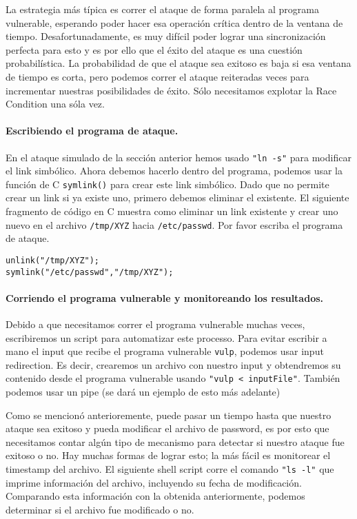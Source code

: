 La estrategia más típica es correr el ataque de forma paralela al programa vulnerable, esperando poder hacer esa operación crítica dentro de la ventana de tiempo. Desafortunadamente, es muy difícil poder lograr una sincronización perfecta para esto y es por ello que el éxito del ataque es una cuestión probabilística. La probabilidad de que el ataque sea exitoso es baja si esa ventana de tiempo es corta, pero podemos correr el ataque reiteradas veces para incrementar nuestras posibilidades de éxito.
Sólo necesitamos explotar la Race Condition una sóla vez.


\paragraph{Escribiendo el programa de ataque.} En el ataque simulado de la sección anterior hemos usado \texttt{"ln -s"} para modificar el link simbólico. Ahora debemos hacerlo dentro del programa, podemos usar la función de C {\tt symlink()} para crear este link simbólico. Dado que \linux no permite crear un link si ya existe uno, primero debemos eliminar el existente. El siguiente fragmento de código en C muestra como eliminar un link existente y crear uno nuevo en el archivo {\tt /tmp/XYZ} hacia {\tt /etc/passwd}. Por favor escriba el programa de ataque.

\begin{lstlisting}
unlink("/tmp/XYZ");
symlink("/etc/passwd","/tmp/XYZ");
\end{lstlisting}



\paragraph{Corriendo el programa vulnerable y monitoreando los resultados.}
Debido a que necesitamos correr el programa vulnerable muchas veces, escribiremos un script para automatizar este processo.
Para evitar escribir a mano el input que recibe el programa vulnerable \texttt{vulp}, podemos usar input redirection. Es decir, crearemos un archivo con nuestro input y obtendremos su contenido desde el programa vulnerable usando \texttt{"vulp < inputFile"}. También podemos usar un pipe (se dará un ejemplo de esto más adelante)

Como se mencionó anterioremente, puede pasar un tiempo hasta que nuestro ataque sea exitoso y pueda modificar el archivo de password, es por esto que necesitamos contar algún tipo de mecanismo para detectar si nuestro ataque fue exitoso o no. Hay muchas formas de lograr esto; la más fácil es monitorear el timestamp del archivo.
El siguiente shell script corre el comando \texttt{"ls -l"} que imprime información del archivo, incluyendo su fecha de modificación. Comparando esta información con la obtenida anteriormente, podemos determinar si el archivo fue modificado o no.

